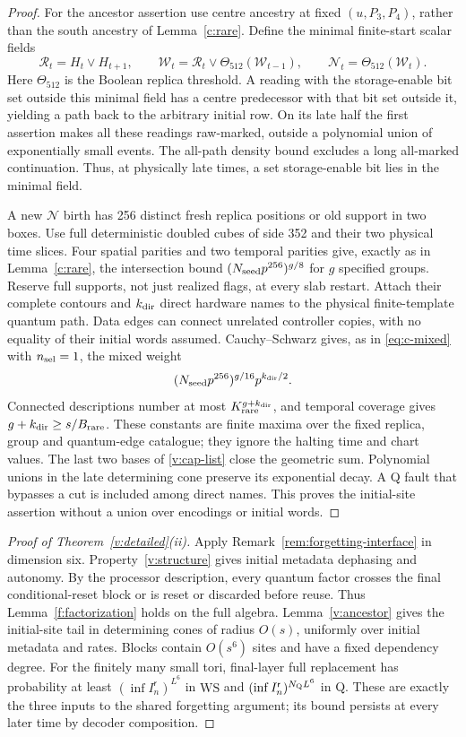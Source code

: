 \begin{proof}
For the ancestor assertion use centre ancestry at fixed
\((u,P_3,P_4)\), rather than the south ancestry of
Lemma~\ref{c:rare}. Define the minimal finite-start scalar fields
\[
 \mathcal R_t=H_t\lor H_{t+1},\qquad
 \mathcal W_t=\mathcal R_t\lor\Theta_{512}(\mathcal W_{t-1}),
 \qquad\mathcal N_t=\Theta_{512}(\mathcal W_t).
\]
Here \(\Theta_{512}\) is the Boolean replica threshold. A reading with the storage-enable bit set outside this minimal field has a centre predecessor with that bit set outside it, yielding a path back to the arbitrary initial row. On its
late half the first assertion makes all these readings raw-marked,
outside a polynomial union of exponentially small events. The all-path
density bound excludes a long all-marked continuation. Thus, at physically late times, a set storage-enable bit lies in the minimal field.

A new \(\mathcal N\) birth has 256 distinct fresh replica positions
or old support in two boxes. Use full deterministic doubled cubes of
side 352 and their two physical time slices. Four spatial parities and
two temporal parities give, exactly as in Lemma~\ref{c:rare}, the
intersection bound \((N_{\rm seed}p^{256})^{g/8}\) for \(g\) specified
groups. Reserve full supports, not just realized flags, at every slab
restart. Attach their complete contours and \(k_{\rm dir}\) direct
hardware names to the physical finite-template quantum path. Data edges
can connect unrelated controller copies, with no equality of their
initial words assumed. Cauchy--Schwarz gives, as in
\eqref{eq:c-mixed} with \(n_{\rm sel}=1\), the mixed weight
\[
 (N_{\rm seed}p^{256})^{g/16}p^{k_{\rm dir}/2}.
\]
Connected descriptions number at most
\(K_{\rm rare}^{g+k_{\rm dir}}\), and temporal coverage gives
\(g+k_{\rm dir}\ge s/B_{\rm rare}\). These constants are finite maxima
over the fixed replica, group and quantum-edge catalogue;
they ignore the halting time and chart values. The last two bases of
\eqref{v:cap-list} close the geometric sum. Polynomial unions in the
late determining cone preserve its exponential decay. A Q fault
that bypasses a cut is included among direct names. This proves the
initial-site assertion without a union over encodings or initial words.
\end{proof}

\begin{proof}[Proof of Theorem~\ref{v:detailed}(ii)]
Apply Remark~\ref{rem:forgetting-interface} in dimension six. Property~\ref{v:structure} gives initial metadata dephasing and autonomy. By the processor description, every quantum factor crosses the final conditional-reset block or is reset or discarded before reuse. Thus Lemma~\ref{f:factorization} holds on the full algebra. Lemma~\ref{v:ancestor} gives the initial-site tail in determining cones of radius \(O(s)\), uniformly over initial metadata and rates. Blocks contain \(O(s^6)\) sites and have a fixed dependency degree. For the finitely many small tori, final-layer full replacement has probability at least \((\inf I_n^{\mathsf r})^{L^6}\) in \(\mathrm{WS}\) and \((\inf I_n^{\mathsf r})^{N_{\rm Q}L^6}\) in Q. These are exactly the three inputs to the shared forgetting argument; its bound persists at every later time by decoder composition.
\end{proof}

